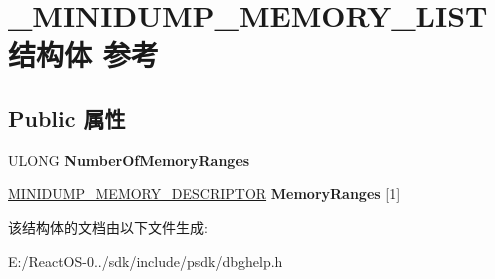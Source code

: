 \hypertarget{struct___m_i_n_i_d_u_m_p___m_e_m_o_r_y___l_i_s_t}{}\section{\+\_\+\+M\+I\+N\+I\+D\+U\+M\+P\+\_\+\+M\+E\+M\+O\+R\+Y\+\_\+\+L\+I\+S\+T结构体 参考}
\label{struct___m_i_n_i_d_u_m_p___m_e_m_o_r_y___l_i_s_t}
\subsection*{Public 属性}
\begin{DoxyCompactItemize}
\item 
\mbox{\label{struct___m_i_n_i_d_u_m_p___m_e_m_o_r_y___l_i_s_t_a84372b04f8c396093f63456380836914}} 
U\+L\+O\+NG {\bfseries Number\+Of\+Memory\+Ranges}
\item 
\mbox{\label{struct___m_i_n_i_d_u_m_p___m_e_m_o_r_y___l_i_s_t_abf04b392ad7be9c541baf8d33cb48f9c}} 
\hyperlink{struct___m_i_n_i_d_u_m_p___m_e_m_o_r_y___d_e_s_c_r_i_p_t_o_r}{M\+I\+N\+I\+D\+U\+M\+P\+\_\+\+M\+E\+M\+O\+R\+Y\+\_\+\+D\+E\+S\+C\+R\+I\+P\+T\+OR} {\bfseries Memory\+Ranges} \mbox{[}1\mbox{]}
\end{DoxyCompactItemize}


该结构体的文档由以下文件生成\+:\begin{DoxyCompactItemize}
\item 
E\+:/\+React\+O\+S-\/0../sdk/include/psdk/dbghelp.\+h\end{DoxyCompactItemize}

